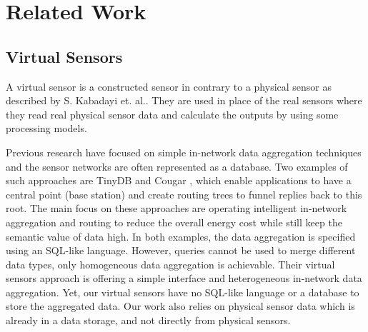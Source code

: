 \documentclass[USenglish]{uit-thesis}
\begin{document}
\chapter{Related Work}

\section{Virtual Sensors}
A virtual sensor is a constructed sensor in contrary to a physical sensor as described by S. Kabadayi et. al.\cite{VirtualSensors2006}. They are used in place of the real sensors where they read real physical sensor data and calculate the outputs by using some processing models.

Previous research have focused on simple in-network data aggregation techniques and the sensor networks are often represented as a database. Two examples of such approaches are TinyDB \cite{tinyDB} and Cougar \cite{cougar}, which enable applications to have a central point (base station) and create routing trees  to funnel replies back to this root. The main focus on these approaches are operating intelligent in-network aggregation and routing to reduce  the overall energy cost while still keep the semantic value of data high.
In both examples, the data aggregation is specified using an SQL-like language. However, queries cannot be used to merge different data types, only homogeneous data aggregation is achievable.
Their virtual sensors approach is  offering a simple interface and heterogeneous in-network data aggregation. Yet, our virtual sensors have no SQL-like language or a database to store the aggregated data. Our work also relies on physical sensor data which is already in a data storage, and not directly from physical sensors.
\end{document}
